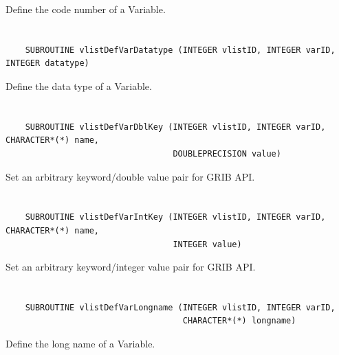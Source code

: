 Define the code number of a Variable.


\section*{\tt {}}

\begin{verbatim}
    SUBROUTINE vlistDefVarDatatype (INTEGER vlistID, INTEGER varID, INTEGER datatype)
\end{verbatim}

Define the data type of a Variable.


\section*{\tt {}}

\begin{verbatim}
    SUBROUTINE vlistDefVarDblKey (INTEGER vlistID, INTEGER varID, CHARACTER*(*) name,
                                  DOUBLEPRECISION value)
\end{verbatim}

Set an arbitrary keyword/double value pair for GRIB API.


\section*{\tt {}}

\begin{verbatim}
    SUBROUTINE vlistDefVarIntKey (INTEGER vlistID, INTEGER varID, CHARACTER*(*) name,
                                  INTEGER value)
\end{verbatim}

Set an arbitrary keyword/integer value pair for GRIB API.


\section*{\tt {}}

\begin{verbatim}
    SUBROUTINE vlistDefVarLongname (INTEGER vlistID, INTEGER varID,
                                    CHARACTER*(*) longname)
\end{verbatim}

Define the long name of a Variable.


\section*{\tt {}}

